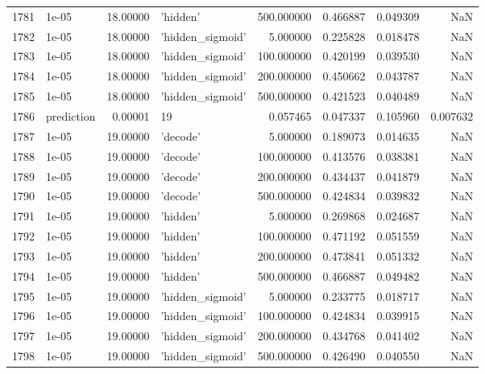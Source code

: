 \documentclass[10pt,a4paper]{article}
\begin{document}
\begin{tabular}{llrlrrrr}
1781 &       1e-05 &  18.00000 &           'hidden' &  500.000000 &  0.466887 &  0.049309 &       NaN \\
1782 &       1e-05 &  18.00000 &   'hidden\_sigmoid' &    5.000000 &  0.225828 &  0.018478 &       NaN \\
1783 &       1e-05 &  18.00000 &   'hidden\_sigmoid' &  100.000000 &  0.420199 &  0.039530 &       NaN \\
1784 &       1e-05 &  18.00000 &   'hidden\_sigmoid' &  200.000000 &  0.450662 &  0.043787 &       NaN \\
1785 &       1e-05 &  18.00000 &   'hidden\_sigmoid' &  500.000000 &  0.421523 &  0.040489 &       NaN \\
1786 &  prediction &   0.00001 &                 19 &    0.057465 &  0.047337 &  0.105960 &  0.007632 \\
1787 &       1e-05 &  19.00000 &           'decode' &    5.000000 &  0.189073 &  0.014635 &       NaN \\
1788 &       1e-05 &  19.00000 &           'decode' &  100.000000 &  0.413576 &  0.038381 &       NaN \\
1789 &       1e-05 &  19.00000 &           'decode' &  200.000000 &  0.434437 &  0.041879 &       NaN \\
1790 &       1e-05 &  19.00000 &           'decode' &  500.000000 &  0.424834 &  0.039832 &       NaN \\
1791 &       1e-05 &  19.00000 &           'hidden' &    5.000000 &  0.269868 &  0.024687 &       NaN \\
1792 &       1e-05 &  19.00000 &           'hidden' &  100.000000 &  0.471192 &  0.051559 &       NaN \\
1793 &       1e-05 &  19.00000 &           'hidden' &  200.000000 &  0.473841 &  0.051332 &       NaN \\
1794 &       1e-05 &  19.00000 &           'hidden' &  500.000000 &  0.466887 &  0.049482 &       NaN \\
1795 &       1e-05 &  19.00000 &   'hidden\_sigmoid' &    5.000000 &  0.233775 &  0.018717 &       NaN \\
1796 &       1e-05 &  19.00000 &   'hidden\_sigmoid' &  100.000000 &  0.424834 &  0.039915 &       NaN \\
1797 &       1e-05 &  19.00000 &   'hidden\_sigmoid' &  200.000000 &  0.434768 &  0.041402 &       NaN \\
1798 &       1e-05 &  19.00000 &   'hidden\_sigmoid' &  500.000000 &  0.426490 &  0.040550 &       NaN \\

\end{tabular}
\end{document}
